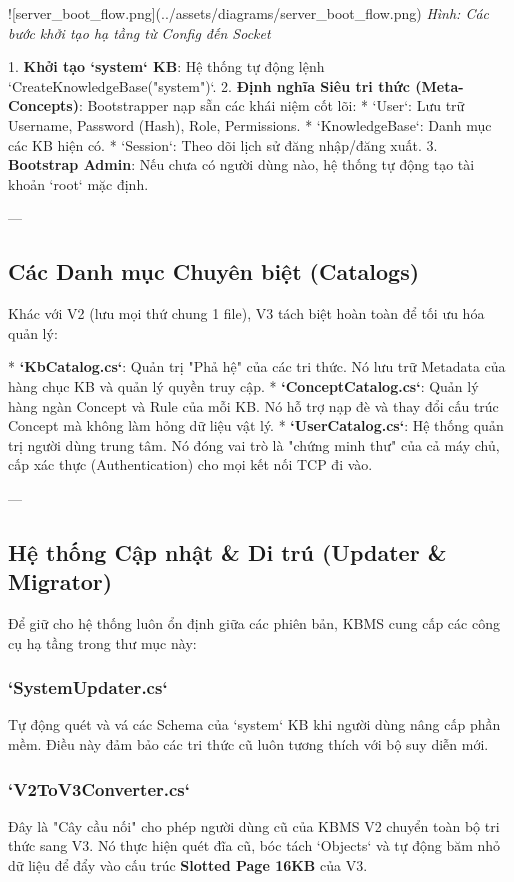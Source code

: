 ![server\_boot\_flow.png](../assets/diagrams/server\_boot\_flow.png)
\textit{Hình: Các bước khởi tạo hạ tầng từ Config đến Socket}

1.  \textbf{Khởi tạo `system` KB}: Hệ thống tự động lệnh `CreateKnowledgeBase("system")`.
2.  \textbf{Định nghĩa Siêu tri thức (Meta-Concepts)}: 
    Bootstrapper nạp sẵn các khái niệm cốt lõi:
    *   `User`: Lưu trữ Username, Password (Hash), Role, Permissions.
    *   `KnowledgeBase`: Danh mục các KB hiện có.
    *   `Session`: Theo dõi lịch sử đăng nhập/đăng xuất.
3.  \textbf{Bootstrap Admin}: Nếu chưa có người dùng nào, hệ thống tự động tạo tài khoản `root` mặc định.

---

\subsection{Các Danh mục Chuyên biệt (Catalogs)}

Khác với V2 (lưu mọi thứ chung 1 file), V3 tách biệt hoàn toàn để tối ưu hóa quản lý:

*   \textbf{`KbCatalog.cs`}: Quản trị "Phả hệ" của các tri thức. Nó lưu trữ Metadata của hàng chục KB và quản lý quyền truy cập.
*   \textbf{`ConceptCatalog.cs`}: Quản lý hàng ngàn Concept và Rule của mỗi KB. Nó hỗ trợ nạp đè và thay đổi cấu trúc Concept mà không làm hỏng dữ liệu vật lý.
*   \textbf{`UserCatalog.cs`}: Hệ thống quản trị người dùng trung tâm. Nó đóng vai trò là "chứng minh thư" của cả máy chủ, cấp xác thực (Authentication) cho mọi kết nối TCP đi vào.

---

\subsection{Hệ thống Cập nhật & Di trú (Updater & Migrator)}

Để giữ cho hệ thống luôn ổn định giữa các phiên bản, KBMS cung cấp các công cụ hạ tầng trong thư mục này:

\subsubsection{`SystemUpdater.cs`}
Tự động quét và vá các Schema của `system` KB khi người dùng nâng cấp phần mềm. Điều này đảm bảo các tri thức cũ luôn tương thích với bộ suy diễn mới.

\subsubsection{`V2ToV3Converter.cs`}
Đây là "Cây cầu nối" cho phép người dùng cũ của KBMS V2 chuyển toàn bộ tri thức sang V3. Nó thực hiện quét đĩa cũ, bóc tách `Objects` và tự động băm nhỏ dữ liệu để đẩy vào cấu trúc \textbf{Slotted Page 16KB} của V3.

